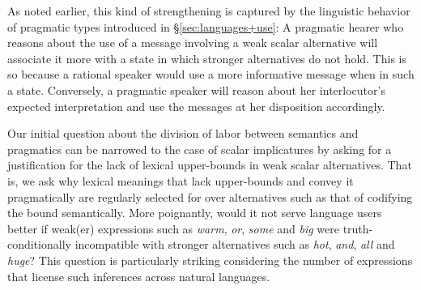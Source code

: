\documentclass[a4paper]{article}
\begin{document}
As noted earlier, this kind of strengthening is captured by the linguistic behavior of pragmatic types introduced in \S\ref{sec:languages+use}: A pragmatic hearer who reasons about the use of a message involving a weak scalar alternative will associate it more with a state in which stronger alternatives do not hold. This is so because a rational speaker would use a more informative message when in such a state. Conversely, a pragmatic speaker will reason about her interlocutor's expected interpretation and use the messages at her disposition accordingly. 

Our initial question about the division of labor between semantics and pragmatics can be narrowed to the case of scalar implicatures by asking for a justification for the lack of lexical upper-bounds in weak scalar alternatives. That is, we ask why lexical meanings that lack upper-bounds and convey it pragmatically are regularly selected for over alternatives such as that of codifying the bound semantically. More poignantly, would it not serve language users better if weak(er) expressions such as {\em warm}, {\em or}, {\em some} and {\em big} were truth-conditionally incompatible with stronger alternatives such as {\em hot}, {\em and}, {\em all} and {\em huge}?  This question is particularly striking considering the number of expressions that license such inferences across natural languages. 
\end{document}
